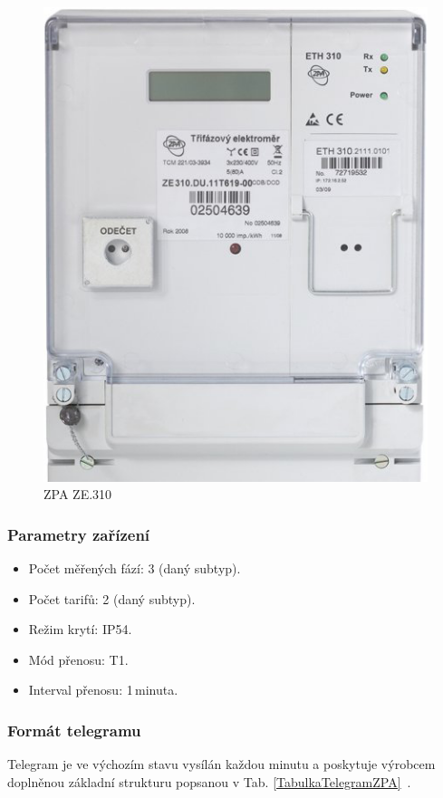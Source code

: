 	 \begin{figure}[!h]
  \begin{center}
    \includegraphics[scale=0.35]{obrazky/zarizeni_zpa}
  \end{center}
	\vspace{-20pt}
  \caption{ZPA ZE.310~\cite{CidloZpa}}
	\vspace{-30pt}
\end{figure}


\subsubsection{Parametry zařízení}
\begin{itemize}
	\item Počet měřených fází: 3 (daný subtyp).
	\item Počet tarifů: 2 (daný subtyp).
	\item Režim krytí: IP54.
	\item Mód přenosu: T1.
	\item Interval přenosu: 1\,minuta.
\end{itemize}

\subsubsection{Formát telegramu}
Telegram je ve výchozím stavu vysílán každou minutu a poskytuje výrobcem doplněnou základní strukturu popsanou v Tab. \ref{TabulkaTelegramZPA}~\cite{CidloZpa}.

